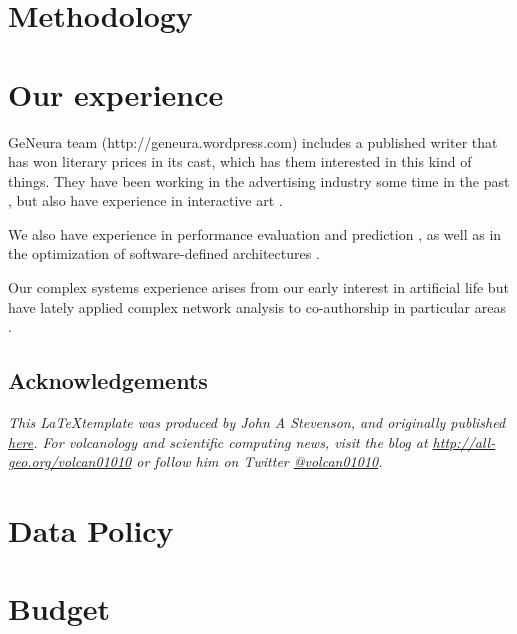\documentclass[a4paper,12pt,twocolumn]{article}
\begin{document}
\section{Methodology}
\label{sec:meth}

\section{Our experience}
\label{sec:exp}

GeNeura team (http://geneura.wordpress.com) includes a published
writer that has won literary prices in its cast, which has them
interested in this kind of things. They have been working in the
advertising industry some time in the past
\cite{merelo:ecal97,AISB97}, but also have experience in interactive
art \cite{DBLP:conf/cec/TrujilloVVG13,DBLP:conf/cec/FernandesIBRG11}.


We also have experience in performance evaluation and prediction
\cite{castillo:evostar08,hardwareevo}, as well as in the optimization of
software-defined architectures \cite{gecco08:castillo}.

Our complex systems experience arises from our early interest in
artificial life \cite{ecal93} but have lately applied complex network
analysis to co-authorship in particular areas
\cite{ec-network-2007,merelo2013complex,DBLP:journals/corr/abs-1108-0261}. 

\subsection*{Acknowledgements}
\textit{This \LaTeX template was produced by John A Stevenson, and originally published \href{http://all-geo.org/volcan01010/2013/07/grant-applications-are-hard-work-includes-latex-template}{here}.  For volcanology and scientific computing news, visit the blog at \href{http://all-geo.org/volcan01010}{http://all-geo.org/volcan01010} or follow him on Twitter \href{https://twitter.com/volcan01010}{@volcan01010}.}


\twocolumn[
  \begin{@twocolumnfalse}

\end{@twocolumnfalse}
]

\section{Data Policy}

\section{Budget}
\end{document}
